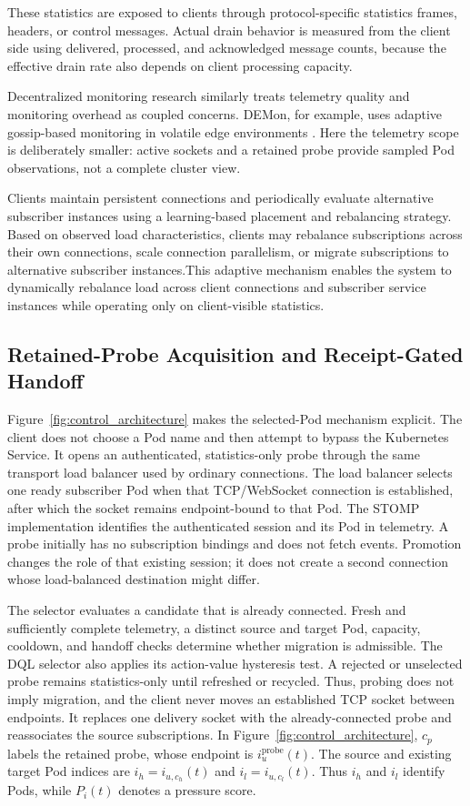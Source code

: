 \documentclass[manuscript]{acmart}
\begin{document}
These statistics are exposed to clients through protocol-specific statistics
frames, headers, or control messages. Actual drain behavior is measured from the client side using delivered,
processed, and acknowledged message counts, because the effective drain rate also depends on client processing capacity.

Decentralized monitoring research similarly treats telemetry quality and
monitoring overhead as coupled concerns. DEMon, for example, uses adaptive
gossip-based monitoring in volatile edge environments \cite{Ilager2026DEMon}.
Here the telemetry scope is deliberately smaller: active sockets and a retained
probe provide sampled Pod observations, not a complete cluster view.

Clients maintain persistent connections and periodically evaluate alternative subscriber instances using a learning-based placement and rebalancing strategy. Based on observed load characteristics, clients may rebalance subscriptions across their own connections, scale connection parallelism, or migrate subscriptions to alternative subscriber instances.This adaptive mechanism enables the system to dynamically rebalance load across client connections and subscriber service instances while operating only on client-visible statistics.

\subsection{Retained-Probe Acquisition and Receipt-Gated Handoff}
\label{sec:probe_handoff}

Figure~\ref{fig:control_architecture} makes the selected-Pod mechanism
explicit. The client does not choose a Pod name and then attempt to bypass the
Kubernetes Service. It opens an authenticated, statistics-only probe through
the same transport load balancer used by ordinary connections. The load
balancer selects one ready subscriber Pod when that TCP/WebSocket connection is
established, after which the socket remains endpoint-bound to that Pod. The
STOMP implementation identifies the authenticated session and its Pod in
telemetry. A probe initially has no subscription bindings and does not fetch
events. Promotion changes the role of that existing session; it does not
create a second connection whose load-balanced destination might differ.

The selector evaluates a candidate that is already connected. Fresh and
sufficiently complete telemetry, a distinct source and target Pod, capacity,
cooldown, and handoff checks determine whether migration is admissible. The
DQL selector also applies its action-value hysteresis test. A rejected or
unselected probe remains statistics-only until refreshed or recycled. Thus,
probing does not imply migration, and the client never moves an established
TCP socket between endpoints. It replaces one delivery socket with the
already-connected probe and reassociates the source subscriptions.
In Figure~\ref{fig:control_architecture}, $c_p$ labels the retained probe,
whose endpoint is $i_u^{\mathrm{probe}}(t)$. The source and existing target Pod indices
are $i_h=i_{u,c_h}(t)$ and $i_l=i_{u,c_l}(t)$. Thus $i_h$ and $i_l$ identify
Pods, while $P_i(t)$ denotes a pressure score.
\end{document}
